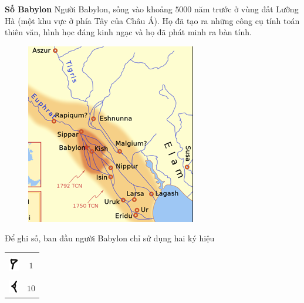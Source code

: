 \begin{multicols}{2}
	\textbf{\color{toancuabi}Số Babylon}
	\vskip 0.1cm
	Người Babylon, sống vào khoảng $5000$ năm trước ở vùng đất Lưỡng Hà (một khu vực ở phía Tây của  Châu Á). Họ đã tạo ra những công cụ tính toán thiên văn, hình học đáng kinh ngạc và họ đã phát minh ra bàn tính.
		\begin{figure}[H]
		\centering
		\vspace*{-5pt}
		\captionsetup{labelformat= empty, justification=centering}
		\includegraphics[width=1\linewidth]{17.1}
		\vspace*{-15pt}
	\end{figure}
	Để ghi số, ban đầu người Babylon chỉ sử dụng hai ký hiệu 
	\begin{table}[H]
		\vspace*{-10pt}
		\centering
		\begin{tabular}{|c|c|}
			\hline
			& \\[-2.5ex]
			\includegraphics[scale=0.7]{15}&$1$\\
			\hline
			& \\[-2.5ex]
			\includegraphics[scale=0.65]{16}&$10$\\

\end{tabular}
\end{table}
\end{multicols}
